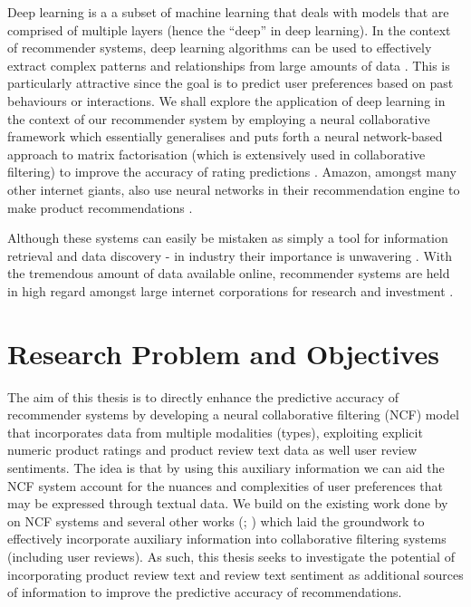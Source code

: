 Deep learning is a a subset of machine learning that deals with models that are comprised of multiple layers (hence the “deep” in deep learning). In the context of recommender systems, deep learning algorithms can be used to effectively extract complex patterns and relationships from large amounts of data \cite{he2017neural}. This is particularly attractive since the goal is to predict user preferences based on past behaviours or interactions. We shall explore the application of deep learning in the context of our recommender system by employing a neural collaborative framework which essentially generalises and puts forth a neural network-based approach to matrix factorisation (which is extensively used in collaborative filtering) to improve the accuracy of rating predictions \cite{he2017neural}. Amazon, amongst many other internet giants, also use neural networks in their recommendation engine to make product recommendations \cite{steck2021deep}. 

Although these systems can easily be mistaken as simply a tool for information retrieval and data discovery - in industry their importance is unwavering \cite{he2017neural}. With the tremendous amount of data available online, recommender systems are held in high regard amongst large internet corporations for research and investment \cite{steck2021deep}. 

\section{Research Problem and Objectives}
\label{sec:1 Research Problem and Objectives}

The aim of this thesis is to directly enhance the predictive accuracy of recommender systems by developing a neural collaborative filtering (NCF) model that incorporates data from multiple modalities (types), exploiting explicit numeric product ratings and product review text data as well user review sentiments. The idea is that by using this auxiliary information we can aid the NCF system account for the nuances and complexities of user preferences that may be expressed through textual data. We build on the existing work done by \cite{he2017neural} on NCF systems and several other works (\cite{srifi2020recommender}; \cite{zhang2014urcf}) which laid the groundwork to effectively incorporate auxiliary information into collaborative filtering systems (including user reviews). As such, this thesis seeks to investigate the potential of incorporating product review text and review text sentiment as additional sources of information to improve the predictive accuracy of recommendations. 

